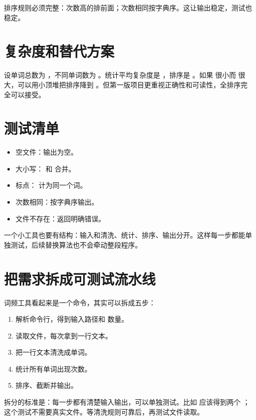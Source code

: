 排序规则必须完整：次数高的排前面；次数相同按字典序。这让输出稳定，测试也稳定。

\section{复杂度和替代方案}

设单词总数为 ，不同单词数为 。统计平均复杂度是 ，排序是 。如果  很小而  很大，可以用小顶堆把排序降到 。但第一版项目更重视正确性和可读性，全排序完全可以接受。

\section{测试清单}

\begin{itemize}
  \item 空文件：输出为空。
  \item 大小写： 和  合并。
  \item 标点： 计为同一个词。
  \item 次数相同：按字典序输出。
  \item 文件不存在：返回明确错误。
\end{itemize}

\begin{keyidea}
一个小工具也要有结构：输入和清洗、统计、排序、输出分开。这样每一步都能单独测试，后续替换算法也不会牵动整段程序。
\end{keyidea}

\section{把需求拆成可测试流水线}

词频工具看起来是一个命令，其实可以拆成五步：

\begin{enumerate}
  \item 解析命令行，得到输入路径和  数量。
  \item 读取文件，每次拿到一行文本。
  \item 把一行文本清洗成单词。
  \item 统计所有单词出现次数。
  \item 排序、截断并输出。
\end{enumerate}

拆分的标准是：每一步都有清楚输入输出，可以单独测试。比如  应该得到两个 ；这个测试不需要真实文件。等清洗规则可靠后，再测试文件读取。

